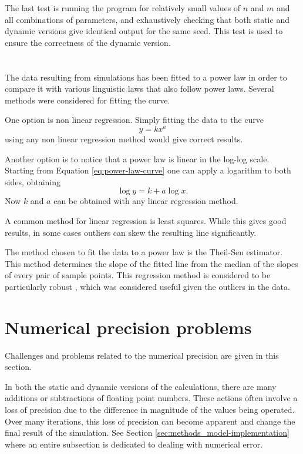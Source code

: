 The last test is running the program for relatively small values of $n$ and $m$ and all combinations of parameters, and exhaustively checking that both static and dynamic versions give identical output for the same seed.
This test is used to ensure the correctness of the dynamic version.

\section{}

The data resulting from simulations has been fitted to a power law in order to compare it with various linguistic laws that also follow power laws.
Several methods were considered for fitting the curve.

One option is non linear regression.
Simply fitting the data to the curve
\begin{equation}
  \label{eq:power-law-curve}
  y=kx^a
\end{equation}
using any non linear regression method would give correct results.

Another option is to notice that a power law is linear in the log-log scale.
Starting from Equation \eqref{eq:power-law-curve} one can apply a logarithm to both sides, obtaining
\begin{equation*}
  \log y = k + a \log x.
\end{equation*}
Now $k$ and $a$ can be obtained with any linear regression method.

A common method for linear regression is least squares.
While this gives good results, in some cases outliers can skew the resulting line significantly.

The method chosen to fit the data to a power law is the Theil-Sen estimator. \cite{Theil1950a}\cite{Sen1968a}
This method determines the slope of the fitted line from the median of the slopes of every pair of sample points.
This regression method is considered to be particularly robust \cite{Leroy1987a}, which was considered useful given the outliers in the data.

\section{Numerical precision problems}
\label{sec:methods_num-prec-probs}

Challenges and problems related to the numerical precision are given in this section.

In both the static and dynamic versions of the calculations, there are many additions or subtractions of floating point numbers.
These actions often involve a loss of precision due to the difference in magnitude of the values being operated.
Over many iterations, this loss of precision can become apparent and change the final result of the simulation.
See Section \ref{sec:methods_model-implementation} where an entire subsection is dedicated to dealing with numerical error.

